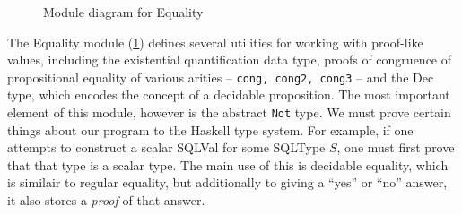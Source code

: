 \begin{figure}[!ht]
{{
                        }}\caption{Module diagram for Equality} 
                        \label{fig:equality}
                    \end{figure}
                    
                    
                    The Equality module (\ref{fig:equality}) defines several 
                    utilities for working
                    with proof-like values, including the existential 
                    quantification data type,
                    proofs of congruence of propositional equality of various 
                    arities --
                    \lstinline{cong, cong2, cong3} -- and the Dec type, which 
                    encodes the concept of
                    a decidable proposition. The most important element of this 
                    module, however is
                    the abstract \lstinline{Not} type. We must prove certain 
                    things about our
                    program to the Haskell type system. For example, if one 
                    attempts to construct a
                    scalar SQLVal for some SQLType $S$, one must first prove 
                    that that type is a
                    scalar type. The main use of this is decidable equality, 
                    which is similair to
                    regular equality, but additionally to giving a ``yes'' or 
                    ``no'' answer, it also
                    stores a \emph{proof} of that answer.
                    

